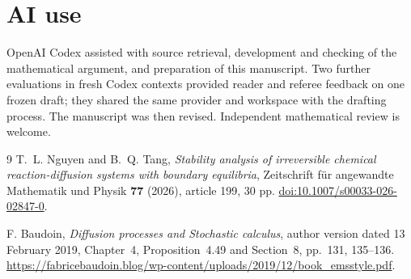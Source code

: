 \documentclass[11pt,a4paper]{article}
\begin{document}
\section*{AI use}
OpenAI Codex assisted with source retrieval, development and checking of the
mathematical argument, and preparation of this manuscript. Two further
evaluations in fresh Codex contexts provided reader and referee feedback
on one frozen draft; they shared the same provider and workspace with the
drafting process. The manuscript was then revised. Independent mathematical
review is welcome.

\begin{thebibliography}{9}
T.~L. Nguyen and B.~Q. Tang,
\emph{Stability analysis of irreversible chemical reaction-diffusion
systems with boundary equilibria},
Zeitschrift f\"ur angewandte Mathematik und Physik
\textbf{77} (2026), article 199, 30 pp.
\href{https://doi.org/10.1007/s00033-026-02847-0}
{doi:10.1007/s00033-026-02847-0}.

F. Baudoin,
\emph{Diffusion processes and Stochastic calculus},
author version dated 13 February 2019,
Chapter~4, Proposition~4.49 and Section~8, pp.~131, 135--136.
\url{https://fabricebaudoin.blog/wp-content/uploads/2019/12/book_emsstyle.pdf}.
\end{thebibliography}
\end{document}
